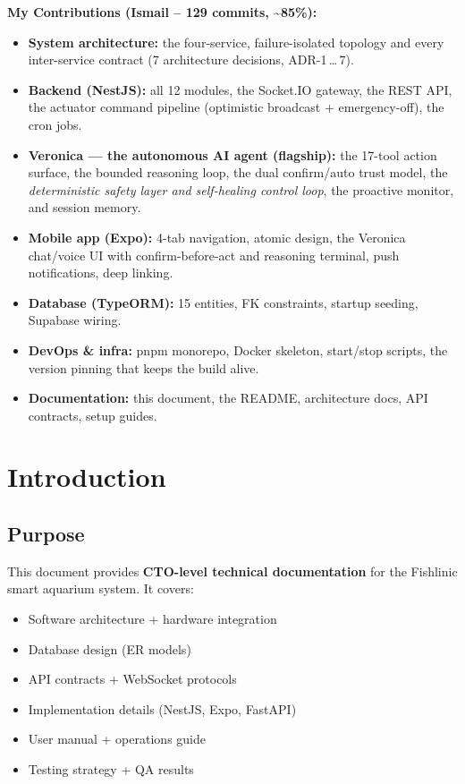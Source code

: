 \documentclass[12pt,a4paper,oneside]{article}
\begin{document}
\textbf{My Contributions (Ismail -- 129 commits, \textasciitilde85\%):}
\begin{itemize}
    \item \textbf{System architecture:} the four-service, failure-isolated topology and every inter-service contract (7 architecture decisions, ADR-1\,\ldots\,7).
    \item \textbf{Backend (NestJS):} all 12 modules, the Socket.IO gateway, the REST API, the actuator command pipeline (optimistic broadcast + emergency-off), the cron jobs.
    \item \textbf{Veronica --- the autonomous AI agent (flagship):} the 17-tool action surface, the bounded reasoning loop, the dual confirm/auto trust model, the \emph{deterministic safety layer and self-healing control loop}, the proactive monitor, and session memory.
    \item \textbf{Mobile app (Expo):} 4-tab navigation, atomic design, the Veronica chat/voice UI with confirm-before-act and reasoning terminal, push notifications, deep linking.
    \item \textbf{Database (TypeORM):} 15 entities, FK constraints, startup seeding, Supabase wiring.
    \item \textbf{DevOps \& infra:} pnpm monorepo, Docker skeleton, start/stop scripts, the version pinning that keeps the build alive.
    \item \textbf{Documentation:} this document, the README, architecture docs, API contracts, setup guides.
\end{itemize}

\newpage
\section{Introduction}

\subsection{Purpose}
This document provides \textbf{CTO-level technical documentation} for the Fishlinic smart aquarium system. It covers:
\begin{itemize}
    \item Software architecture + hardware integration
    \item Database design (ER models)
    \item API contracts + WebSocket protocols
    \item Implementation details (NestJS, Expo, FastAPI)
    \item User manual + operations guide
    \item Testing strategy + QA results
\end{itemize}
\end{document}
